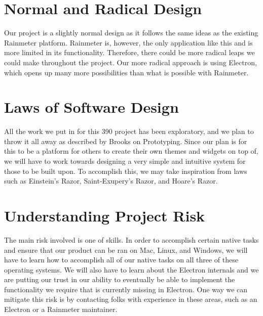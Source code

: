 \documentclass[11pt, oneside]{article}   	%
\begin{document}
\section{Normal and Radical Design}

Our project is a slightly normal design as it follows the same ideas as the
existing Rainmeter platform.  Rainmeter is, however, the only application like
this and is more limited in its functionality. Therefore, there could be more
radical leaps we could make throughout the project.  Our more radical approach
is using Electron, which opens up many more possibilities than what is possible
with Rainmeter.

\section{Laws of Software Design}

All the work we put in for this 390 project has been exploratory, and we plan to
throw it all away as described by Brooks on Prototyping.  Since our plan is for
this to be a platform for others to create their own themes and widgets on top
of, we will have to work towards designing a very simple and intuitive system
for those to be built upon.  To accomplish this, we may take inspiration from
laws such as Einstein's Razor, Saint-Exupery's Razor, and Hoare's Razor.

\section{Understanding Project Risk}

The main risk involved is one of skills.  In order to accomplish certain native
tasks and ensure that our product can be ran on Mac, Linux, and Windows, we will
have to learn how to accomplish all of our native tasks on all three of these
operating systems.  We will also have to learn about the Electron internals and
we are putting our trust in our ability to eventually be able to implement the
functionality we require that is currently missing in Electron.  One way we can
mitigate this risk is by contacting folks with experience in these areas, such
as an Electron or a Rainmeter maintainer.
\end{document}

